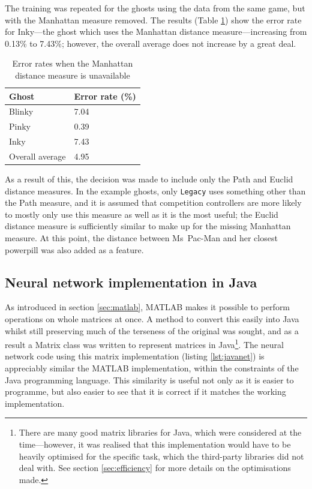 The training was repeated for the ghosts using the data from the same game, but with the Manhattan measure removed.  The results (Table \ref{tab:withoutmanhattan}) show the error rate for Inky---the ghost which uses the Manhattan distance measure---increasing from 0.13\% to 7.43\%; however, the overall average does not increase by a great deal.

\begin{table}[ht]
\centering
\begin{tabular}{ll}
\toprule
Ghost & Error rate (\%) \\
\midrule
Blinky & 7.04 \\
Pinky & 0.39 \\
Inky & 7.43 \\
\midrule
Overall average & 4.95 \\
\bottomrule
\end{tabular}
\caption{Error rates when the Manhattan distance measure is unavailable}
\label{tab:withoutmanhattan}
\end{table}

As a result of this, the decision was made to include only the Path and Euclid distance measures.  In the example ghosts, only {\tt Legacy} uses something other than the Path measure, and it is assumed that competition controllers are more likely to mostly only use this measure as well as it is the most useful; the Euclid distance measure is sufficiently similar to make up for the missing Manhattan measure.  At this point, the distance between Ms~Pac-Man and her closest powerpill was also added as a feature.


\subsection{Neural network implementation in Java}

As introduced in section \ref{sec:matlab}, MATLAB makes it possible to perform operations on whole matrices at once.  A method to convert this easily into Java whilst still preserving much of the terseness of the original was sought, and as a result a Matrix class was written to represent matrices in Java\footnote{There are many good matrix libraries for Java, which were considered at the time---however, it was realised that this implementation would have to be heavily optimised for the specific task, which the third-party libraries did not deal with.  See section \ref{sec:efficiency} for more details on the optimisations made.}.  The neural network code using this matrix implementation (listing \ref{lst:javanet}) is appreciably similar the MATLAB implementation, within the constraints of the Java programming language.  This similarity is useful not only as it is easier to programme, but also easier to see that it is correct if it matches the working implementation.

